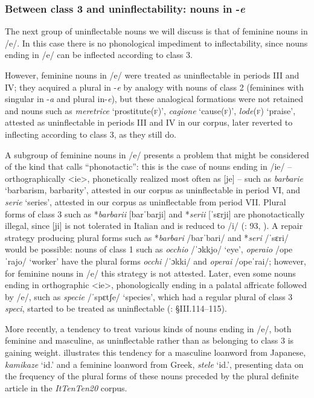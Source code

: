 \documentclass[output=paper]{langscibook}
\begin{document}
\subsubsection{Between class 3 and uninflectability: nouns in \nobreakdash-\textit{e}}

The next group of uninflectable nouns we will discuss is that of feminine nouns in /e/. In this case there is no phonological impediment to inflectability, since nouns ending in /e/ can be inflected according to class 3.

However, feminine nouns in /e/ were treated as uninflectable in periods III and IV; they acquired a plural in \nobreakdash-\textit{e} by analogy with nouns of class 2 (feminines with singular in \nobreakdash-\textit{a} and plural in\nobreakdash-\textit{e}), but these analogical formations were not retained and nouns such as \textit{meretrice} ‘prostitute(\textsc{f})’, \textit{cagione} ‘cause(\textsc{f})’, \textit{lode}(\textsc{f}) ‘praise’, attested as uninflectable in periods III and IV in our corpus, later reverted to inflecting according to class 3, as they still do.

A subgroup of feminine nouns in /e/ presents a problem that might be considered of the kind that \citet{Fedden2019} calls “phonotactic”: this is the case of nouns ending in /ie/ – orthographically <ie>, phonetically realized most often as [je] – such as \textit{barbarie} ‘barbarism, barbarity’, attested in our corpus as uninflectable in period VI, and \textit{serie} ‘series’, attested in our corpus as uninflectable from period VII. Plural forms of class 3 such as *\textit{barbarii} [barˈbarji] and *\textit{serii} [ˈsɛrji] are phonotactically illegal, since [ji] is not tolerated in Italian and is reduced to /i/ (\citealt{Camilli1965}: 93, ). A repair strategy producing plural forms such as *\textit{barbari} /barˈbari/ and *\textit{seri} /ˈsɛri/ would be possible: nouns of class 1 such as \textit{occhio} /ˈɔkkjo/ ‘eye’, \textit{operaio} /opeˈrajo/ ‘worker’ have the plural forms \textit{occhi} /ˈɔkki/ and \textit{operai} /opeˈrai/; however, for feminine nouns in /e/ this strategy is not attested. Later, even some nouns ending in orthographic <ie>, phonologically ending in a palatal affricate followed by /e/, such as \textit{specie} /ˈspɛtʃe/ ‘species’, which had a regular plural of class 3 \textit{speci}, started to be treated as uninflectable (\citealt{Serianni1988}: §III.114–115).

More recently, a tendency to treat various kinds of nouns ending in /e/, both feminine and masculine, as uninflectable rather than as belonging to class 3 is gaining weight.  illustrates this tendency for a masculine loanword from Japanese, \textit{kamikaze} ‘id.’ and a feminine loanword from Greek, \textit{stele} ‘id.’, presenting data on the frequency of the plural forms of these nouns preceded by the plural definite article in the \textit{ItTenTen20} corpus.
\end{document}
